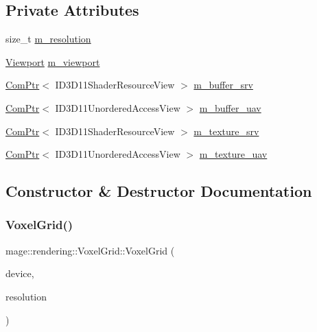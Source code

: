 \subsection*{Private Attributes}
\begin{DoxyCompactItemize}
\item 
size\+\_\+t \hyperlink{classmage_1_1rendering_1_1_voxel_grid_a6f297da985b384ac6785383fd296c230}{m\+\_\+resolution}
\item 
\hyperlink{classmage_1_1rendering_1_1_viewport}{Viewport} \hyperlink{classmage_1_1rendering_1_1_voxel_grid_a02dca68f610cdb271b8895a9377af020}{m\+\_\+viewport}
\item 
\hyperlink{namespacemage_ae74f374780900893caa5555d1031fd79}{Com\+Ptr}$<$ I\+D3\+D11\+Shader\+Resource\+View $>$ \hyperlink{classmage_1_1rendering_1_1_voxel_grid_ab0d154365336f1b8a9a0921cb4ade6a2}{m\+\_\+buffer\+\_\+srv}
\item 
\hyperlink{namespacemage_ae74f374780900893caa5555d1031fd79}{Com\+Ptr}$<$ I\+D3\+D11\+Unordered\+Access\+View $>$ \hyperlink{classmage_1_1rendering_1_1_voxel_grid_a749d37651a7aebb6ab775424508ea92d}{m\+\_\+buffer\+\_\+uav}
\item 
\hyperlink{namespacemage_ae74f374780900893caa5555d1031fd79}{Com\+Ptr}$<$ I\+D3\+D11\+Shader\+Resource\+View $>$ \hyperlink{classmage_1_1rendering_1_1_voxel_grid_a81624e2bc21c444527156637c0415108}{m\+\_\+texture\+\_\+srv}
\item 
\hyperlink{namespacemage_ae74f374780900893caa5555d1031fd79}{Com\+Ptr}$<$ I\+D3\+D11\+Unordered\+Access\+View $>$ \hyperlink{classmage_1_1rendering_1_1_voxel_grid_a768675d9df84ea0283ba108c682df187}{m\+\_\+texture\+\_\+uav}
\end{DoxyCompactItemize}


\subsection{Constructor \& Destructor Documentation}
\hypertarget{classmage_1_1rendering_1_1_voxel_grid_aec475857836dbf56d99f30a9d8f70272}{}\label{classmage_1_1rendering_1_1_voxel_grid_aec475857836dbf56d99f30a9d8f70272} 
\subsubsection{\texorpdfstring{Voxel\+Grid()}{VoxelGrid()}\hspace{0.1cm}{\footnotesize\ttfamily [1/3]}}
{\footnotesize\ttfamily mage\+::rendering\+::\+Voxel\+Grid\+::\+Voxel\+Grid (\begin{DoxyParamCaption}\item[{I\+D3\+D11\+Device \&}]{device,  }\item[{size\+\_\+t}]{resolution }\end{DoxyParamCaption})\hspace{0.3cm}{\ttfamily [explicit]}}

